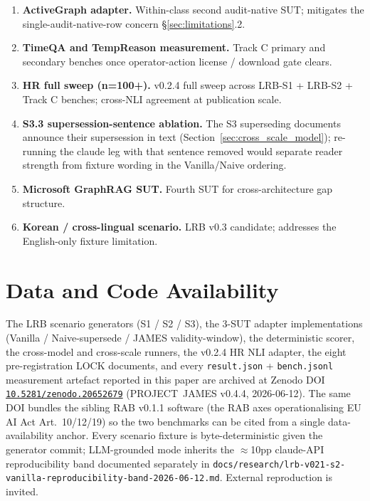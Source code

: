 \documentclass[11pt,a4paper]{article}
\begin{document}
\begin{enumerate}[leftmargin=*]
  \item \textbf{ActiveGraph adapter.} Within-class second audit-native SUT; mitigates the single-audit-native-row concern \S\ref{sec:limitations}.2.
  \item \textbf{TimeQA and TempReason measurement.} Track C primary and secondary benches once operator-action license / download gate clears.
  \item \textbf{HR full sweep (n=100+).} v0.2.4 full sweep across LRB-S1 + LRB-S2 + Track C benches; cross-NLI agreement at publication scale.
  \item \textbf{S3.3 supersession-sentence ablation.} The S3 superseding documents announce their supersession in text (Section~\ref{sec:cross_scale_model}); re-running the claude leg with that sentence removed would separate reader strength from fixture wording in the Vanilla/Naive ordering.
  \item \textbf{Microsoft GraphRAG SUT.} Fourth SUT for cross-architecture gap structure.
  \item \textbf{Korean / cross-lingual scenario.} LRB v0.3 candidate; addresses the English-only fixture limitation.
\end{enumerate}

\section*{Data and Code Availability}

The LRB scenario generators (S1 / S2 / S3), the 3-SUT adapter implementations (Vanilla / Naive-supersede / JAMES validity-window), the deterministic scorer, the cross-model and cross-scale runners, the v0.2.4 HR NLI adapter, the eight pre-registration LOCK documents, and every \texttt{result.json} + \texttt{bench.jsonl} measurement artefact reported in this paper are archived at Zenodo DOI \href{https://doi.org/10.5281/zenodo.20652679}{\texttt{10.5281/zenodo.20652679}} (PROJECT~JAMES v0.4.4, 2026-06-12). The same DOI bundles the sibling RAB v0.1.1 software (the RAB axes operationalising EU AI Act Art.~10/12/19) so the two benchmarks can be cited from a single data-availability anchor. Every scenario fixture is byte-deterministic given the generator commit; LLM-grounded mode inherits the $\approx$10pp claude-API reproducibility band documented separately in \texttt{docs/research/lrb-v021-s2-vanilla-reproducibility-band-2026-06-12.md}. External reproduction is invited.
\end{document}
